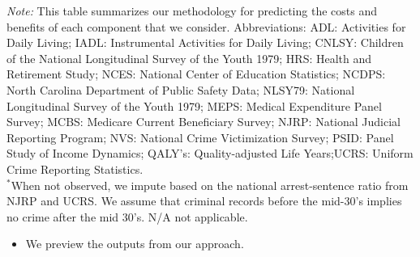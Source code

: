 \documentclass[static]{JJH-Beamer}
\begin{document}
{\flushleft \scriptsize \emph{Note:} This table summarizes our methodology for predicting the costs and benefits of each component that we consider. Abbreviations: ADL: Activities for Daily Living; IADL: Instrumental Activities for Daily Living; CNLSY: Children of the National Longitudinal Survey of the Youth 1979;  HRS: Health and Retirement Study; NCES: National Center of Education Statistics; NCDPS: North Carolina Department of Public Safety Data; NLSY79: National Longitudinal Survey of the Youth 1979; MEPS: Medical Expenditure Panel Survey; MCBS: Medicare Current Beneficiary Survey; NJRP: National Judicial Reporting Program; NVS: National Crime Victimization Survey; PSID: Panel Study of Income Dynamics; QALY's: Quality-adjusted Life Years;UCRS: Uniform Crime Reporting Statistics.\\
$^*$When not observed, we impute based on the national arrest-sentence ratio  from NJRP and UCRS. We assume that criminal records before the mid-30's implies no crime after the mid 30's. N/A not applicable.\\}



\begin{itemize}
\item We preview the outputs from our approach.
\end{itemize}
\end{document}
